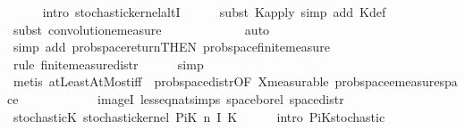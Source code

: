 \begin{isabellebody}
\ \ \ \ \isamarkupfalse%
\ {\isacharparenleft}{\kern0pt}intro\ stochastic{\isacharunderscore}{\kern0pt}kernel{\isacharunderscore}{\kern0pt}altI{\isacharparenright}{\kern0pt}\isanewline
\ \ \ \ \isamarkupfalse%
\ {\isacharparenleft}{\kern0pt}subst\ K{\isacharunderscore}{\kern0pt}apply{\isacharsemicolon}{\kern0pt}\ simp\ add{\isacharcolon}{\kern0pt}\ K{\isacharunderscore}{\kern0pt}def{\isacharparenright}{\kern0pt}\isanewline
\ \ \ \ \isamarkupfalse%
\ {\isacharparenleft}{\kern0pt}subst\ convolution{\isacharunderscore}{\kern0pt}emeasure{\isacharparenright}{\kern0pt}\isanewline
\ \ \ \ \ \ \ \ \ \ \ \isamarkupfalse%
\ auto\isanewline
\ \ \ \ \ \ \ \isamarkupfalse%
\ {\isacharparenleft}{\kern0pt}simp\ add{\isacharcolon}{\kern0pt}\ prob{\isacharunderscore}{\kern0pt}space{\isacharunderscore}{\kern0pt}return{\isacharbrackleft}{\kern0pt}THEN\ prob{\isacharunderscore}{\kern0pt}space{\isachardot}{\kern0pt}finite{\isacharunderscore}{\kern0pt}measure{\isacharbrackright}{\kern0pt}{\isacharparenright}{\kern0pt}\isanewline
\ \ \ \ \ \isamarkupfalse%
\ {\isacharparenleft}{\kern0pt}rule\ finite{\isacharunderscore}{\kern0pt}measure{\isacharunderscore}{\kern0pt}distr{\isacharparenright}{\kern0pt}\isanewline
\ \ \ \ \isamarkupfalse%
\ simp\isanewline
\ \ \ \ \isamarkupfalse%
\ {\isacharparenleft}{\kern0pt}metis\ atLeastAtMost{\isacharunderscore}{\kern0pt}iff\ \ prob{\isacharunderscore}{\kern0pt}space{\isacharunderscore}{\kern0pt}distr{\isacharbrackleft}{\kern0pt}OF\ X{\isacharunderscore}{\kern0pt}measurable{\isacharbrackright}{\kern0pt}\ prob{\isacharunderscore}{\kern0pt}space{\isachardot}{\kern0pt}emeasure{\isacharunderscore}{\kern0pt}space{\isacharunderscore}{\kern0pt}{}\isanewline
\ \ \ \ \ \ \ \ \ \ \ \ imageI\ less{\isacharunderscore}{\kern0pt}eq{\isacharunderscore}{\kern0pt}nat{\isachardot}{\kern0pt}simps{\isacharparenleft}{\kern0pt}{}{\isacharparenright}{\kern0pt}\ space{\isacharunderscore}{\kern0pt}borel\ space{\isacharunderscore}{\kern0pt}distr{\isacharparenright}{\kern0pt}\isanewline
\ \ \isamarkupfalse%
\ \isamarkupfalse%
\ stochastic{\isacharunderscore}{\kern0pt}K{\isacharcolon}{\kern0pt}\ {\isachardoublequoteopen}stochastic{\isacharunderscore}{\kern0pt}kernel\ {\isacharparenleft}{\kern0pt}PiK\ n\ I\ K{\isacharparenright}{\kern0pt}{\isachardoublequoteclose}\isanewline
\ \ \ \ \isamarkupfalse%
\ {\isacharparenleft}{\kern0pt}intro\ PiK{\isacharunderscore}{\kern0pt}stochastic{\isacharparenright}{\kern0pt}\isanewline

\end{isabellebody}
